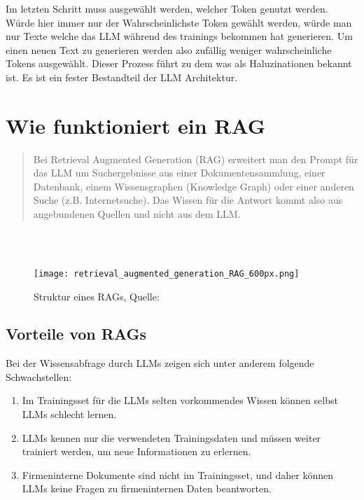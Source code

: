 Im letzten Schritt muss ausgewählt werden, welcher Token genutzt werden. Würde hier immer nur der Wahrscheinlichste Token gewählt werden, würde man nur Texte welche das LLM während des trainings bekommen hat generieren.
Um einen neuen Text zu generieren werden also zufällig weniger wahrscheinliche Tokens ausgewählt. Dieser Prozess führt zu dem was als Haluzinationen bekannt ist. Es ist ein fester Bestandteil der LLM Architektur.


\section{Wie funktioniert ein RAG}

\begin{quote}
    Bei Retrieval Augmented Generation (RAG) erweitert man den Prompt für das LLM um Suchergebnisse aus einer Dokumentensammlung, einer Datenbank, einem Wissensgraphen (Knowledge Graph) oder einer anderen Suche (z.B. Internetsuche). Das Wissen für die Antwort kommt also aus angebundenen Quellen und nicht aus dem LLM.
\end{quote}
\cite{honroth2024retrieval}\\ \\

\begin{figure}[h!]
    \centering
    \texttt{[image: retrieval\_augmented\_generation\_RAG\_600px.png]}
    \caption{Struktur eines RAGs, Quelle: \cite{honroth2024retrieval}}
    \label{fig:Rag Structure}
\end{figure}


\subsection{Vorteile von RAGs}
Bei der Wissensabfrage durch LLMs zeigen sich unter anderem folgende Schwachstellen:
\begin{enumerate}
    \item Im Trainingsset für die LLMs selten vorkommendes Wissen können selbst LLMs schlecht lernen. \cite{gao2023rtre} \cite{press2022measuring}
    \item LLMs kennen nur die verwendeten Trainingsdaten und müssen weiter trainiert werden, um neue Informationen zu erlernen.
    \item Firmeninterne Dokumente sind nicht im Trainingsset, und daher können LLMs keine Fragen zu firmeninternen Daten beantworten.
\end{enumerate}

